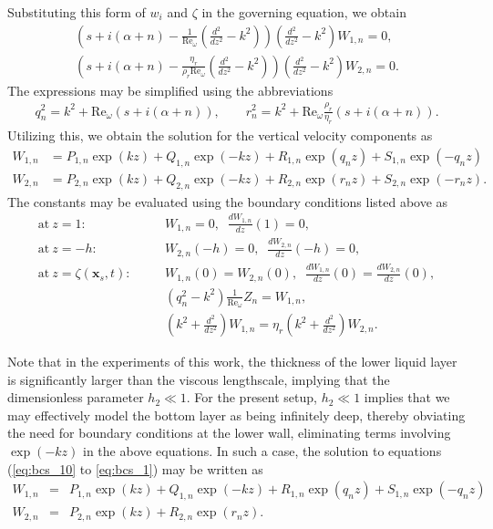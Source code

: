 \documentclass{jfm_arxiv}
\newcommand{\xs}{\mathbf{x}_s}
\renewcommand{\Re}{\text{Re}_\omega}
\begin{document}
Substituting this form of $w_i$ and $\zeta$ in the governing equation, we obtain
\begin{eqnarray}
\left( s+i(\alpha + n) - \frac{1}{\Re}\left( \frac{d^2 }{dz^2}- k^2\right)
\right) \left( \frac{d^2 }{dz^2}-k^2 \right) W_{1,n} = 0,\\
\left( s+i(\alpha + n) - \frac{\eta_r}{\rho_r\Re}\left( \frac{d^2 }{dz^2}- k^2\right)
\right) \left( \frac{d^2 }{dz^2}-k^2 \right) W_{2,n} = 0.
\label{eq:govern_velo_modes}
\end{eqnarray}
The expressions may be simplified using the abbreviations
\begin{eqnarray}
  q_n^2 = k^2 + \Re (s + i (\alpha + n)),\qquad
  r_n^2 = k^2 + \Re\frac{\rho_r}{\eta_r} (s + i (\alpha + n)).
  \label{eq:q_r}
\end{eqnarray}
Utilizing this, we obtain the solution for the vertical velocity components as
\begin{eqnarray}
W_{1,n} &= P_{1,n} \exp (kz) + Q_{1,n}\exp (-kz) + R_{1,n}\exp (q_n z) + S_{1,n}
\exp (-q_n z) \\
W_{2,n} &= P_{2,n} \exp (kz) + Q_{2,n}\exp (-kz) + R_{2,n}\exp (r_n z) + S_{2,n}
\exp (-r_n z).
\label{eq:W_comp_sol}
\end{eqnarray}
The constants may be evaluated using the boundary conditions listed above as 
\begin{eqnarray}
\text{at} \: z = 1: &\quad&  W_{1,n} = 0, \;\; \frac{d W_{1,n}}{d z}(1) = 0, \\
  \label{eq:bcs_10}
\text{at} \: z = -h: &\quad& W_{2,n}(-h) = 0, \;\; \frac{d W_{2,n}}{d z}(-h) = 0, \\
\text{at} \: z = \zeta(\xs,t): &\quad& W_{1,n}(0) = W_{2,n}(0),\;\; \frac{d W_{1,n}}{d z}(0) = \frac{d W_{2,n}}{d z}(0), \\
 &\quad& \left( q_n^2 - k^2 \right) \frac{1}{\Re} Z_n = W_{1,n},\\
 &\quad& \left( k^2 + \frac{d^2 }{d z^2} \right)W_{1,n} = \eta_r\left( k^2 + \frac{d^2 }{d z^2} \right)W_{2,n}.
\label{eq:bcs_1}
\end{eqnarray}

Note that in the experiments of this work, the thickness of the lower liquid layer is significantly larger than the viscous lengthscale, implying that the dimensionless parameter $h_2 \ll 1$. 
For the present setup, $h_2\ll 1$ implies that we may effectively model the bottom layer as being infinitely deep, thereby obviating the need for boundary conditions at the lower wall, eliminating terms involving $\exp(-kz)$ in the above equations. In such a case, the solution to equations (\ref{eq:bcs_10} to \ref{eq:bcs_1}) may be written as
\begin{eqnarray}
W_{1,n} &=& P_{1,n} \exp (kz) + Q_{1,n}\exp (-kz) + R_{1,n}\exp (q_n z) + S_{1,n}
\exp (-q_n z) \\
W_{2,n} &=& P_{2,n} \exp (kz)+ R_{2,n}\exp (r_n z).
\label{eq:new_sol}
\end{eqnarray}
\end{document}
